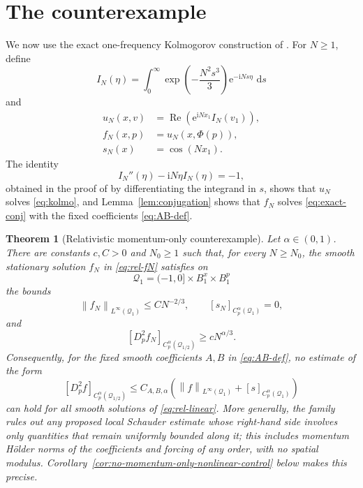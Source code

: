 \documentclass[11pt,reqno]{amsart}
\numberwithin{equation}{section}
\newtheorem{theorem}{Theorem}[section]
\theoremstyle{remark}
\newcommand{\ii}{\mathrm{i}}
\newcommand{\e}{\mathrm{e}}
\newcommand{\dd}{\,\mathrm{d}}
\newcommand{\norm}[1]{\left\|#1\right\|}
\begin{document}
\section{The counterexample}\label{sec:counterexample}

We now use the exact one-frequency Kolmogorov construction of \cite{DW26}.  For $N\ge1$, define
\begin{equation}\label{eq:IN}
   I_N(\eta)=\int_0^\infty
      \exp\!\left(-\frac{N^2s^3}{3}\right)\e^{-\ii Ns\eta}\,\dd s
\end{equation}
and
\begin{equation}\label{eq:rel-fN}
\begin{aligned}
   u_N(x,v)&=\operatorname{Re}\!\left(\e^{\ii Nx_1}I_N(v_1)\right),\\
   f_N(x,p)&=u_N(x,\Phi(p)),\\
   s_N(x)&=\cos(Nx_1).
\end{aligned}
\end{equation}
The identity
\[
   I_N''(\eta)-\ii N\eta I_N(\eta)=-1,
\]
obtained in the proof of \cite[Theorem~2.1]{DW26} by differentiating the integrand in $s$, shows that $u_N$ solves \eqref{eq:kolmo}, and Lemma~\ref{lem:conjugation} shows that $f_N$ solves \eqref{eq:exact-conj} with the fixed coefficients \eqref{eq:AB-def}.

\begin{theorem}[Relativistic momentum-only counterexample]\label{thm:rel-counterexample}
Let $\alpha\in(0,1)$.  There are constants $c,C>0$ and $N_0\ge1$ such that, for every $N\ge N_0$, the smooth stationary solution $f_N$ in \eqref{eq:rel-fN} satisfies on
\[
   \mathcal Q_1=(-1,0]\times B_1^x\times B_1^p
\]
the bounds
\[
   \norm{f_N}_{L^\infty(\mathcal Q_1)}\le CN^{-2/3},
   \qquad
   [s_N]_{C_p^\alpha(\mathcal Q_1)}=0,
\]
and
\[
   [D_p^2f_N]_{C_p^\alpha(\mathcal Q_{1/2})}
   \ge cN^{\alpha/3}.
\]
Consequently, for the fixed smooth coefficients $A,B$ in \eqref{eq:AB-def}, no estimate of the form
\begin{equation}\label{eq:rel-false-est}
   [D_p^2f]_{C_p^\alpha(\mathcal Q_{1/2})}
   \le C_{A,B,\alpha}
   \left(\norm f_{L^\infty(\mathcal Q_1)}+[s]_{C_p^\alpha(\mathcal Q_1)}\right)
\end{equation}
can hold for all smooth solutions of \eqref{eq:rel-linear}.  More generally, the family rules out any proposed local Schauder estimate whose right-hand side involves only quantities that remain uniformly bounded along it; this includes momentum H\"older norms of the coefficients and forcing of any order, with no spatial modulus.  Corollary~\ref{cor:no-momentum-only-nonlinear-control} below makes this precise.
\end{theorem}
\end{document}
